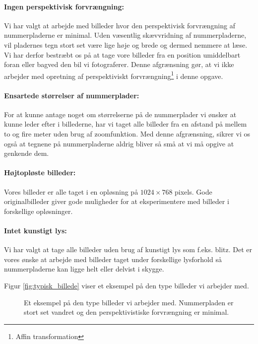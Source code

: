 \paragraph{Ingen perspektivisk forvrængning:}
Vi har valgt at arbejde med billeder hvor den perspektivisk forvrængning af nummerpladerne er minimal. Uden væsentlig skævvridning af nummerpladerne, vil pladernes tegn stort set være lige høje og brede og dermed nemmere at læse. Vi har derfor bestræbt os på at tage vore billeder fra en position umiddelbart foran eller bagved den bil vi fotograferer. Denne afgrænsning gør, at vi ikke arbejder med opretning af perspektiviskt forvrængning\footnote{Affin transformation} i denne opgave. 

\paragraph{Ensartede størrelser af nummerplader:}
For at kunne antage noget om størrelserne på de nummerplader vi ønsker at kunne leder efter i billederne, har vi taget alle billeder fra en afstand på mellem to og fire meter uden brug af zoomfunktion. Med denne afgrænsning, sikrer vi os også at tegnene på nummerpladerne aldrig bliver så små at vi må opgive at genkende dem.

\paragraph{Højtopløste billeder:}
Vores billeder er alle taget i en opløsning på $1024 \times 768$ pixels. Gode originalbilleder giver gode muligheder for at eksperimentere med billeder i forskellige opløsninger. 

\paragraph{Intet kunstigt lys:}
Vi har valgt at tage alle billeder uden brug af kunstigt lys som f.eks. blitz. Det er vores ønske at arbejde med billeder taget under forskellige lysforhold så nummerpladerne kan ligge helt eller delvist i skygge.  

Figur \vref{fig:typisk_billede} viser et eksempel på den type billeder vi arbejder med.

\begin{figure}[htp]
\centering
{} 
\caption{Et eksempel på den type billeder vi arbejder med. Nummerpladen er stort set vandret og den perspektivistiske forvrængning er minimal.}
\label{fig:typisk_billede}
\end{figure}

